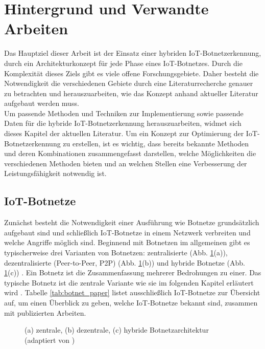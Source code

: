 \section{Hintergrund und Verwandte Arbeiten}

Das Hauptziel dieser Arbeit ist der Einsatz einer hybriden IoT-Botnetzerkennung, durch ein Architekturkonzept für jede Phase eines IoT-Botnetzes. Durch die Komplexität dieses Ziels gibt es viele offene Forschungsgebiete. Daher besteht die Notwendigkeit die verschiedenen Gebiete durch eine Literaturrecherche genauer zu betrachten und herauszuarbeiten, wie das Konzept anhand aktueller Literatur aufgebaut werden muss. \\[0.2in]

Um passende Methoden und Techniken zur Implementierung sowie passende Daten für die hybride IoT-Botnetzerkennung herauszuarbeiten, widmet sich dieses Kapitel der aktuellen Literatur. Um ein Konzept zur Optimierung der IoT-Botnetzerkennung zu erstellen, ist es wichtig, dass bereits bekannte Methoden und deren Kombinationen zusammengefasst darstellen, welche Möglichkeiten die verschiedenen Methoden bieten und an welchen Stellen eine Verbesserung der Leistungsfähigkeit notwendig ist. 

\subsection{IoT-Botnetze}

Zunächst besteht die Notwendigkeit einer Ausführung wie Botnetze grundsätzlich aufgebaut sind und schließlich IoT-Botnetze in einem Netzwerk verbreiten und welche Angriffe möglich sind. Beginnend mit Botnetzen im allgemeinen gibt es typischerweise drei Varianten von Botnetzen: zentralisierte (Abb. \ref{fig:bot_arch}(a)), dezentralisierte (Peer-to-Peer, P2P) (Abb. \ref{fig:bot_arch}(b)) und hybride Botnetze (Abb. \ref{fig:bot_arch}(c)) \cite{sharma_2022,10.1007/978-3-030-33229-7_21,DBLP:series/isc/Oorschot21}. Ein Botnetz ist die Zusammenfassung mehrerer Bedrohungen zu einer. Das typische Botnetz ist die zentrale Variante wie sie im folgenden Kapitel erläutert wird \cite{SCHILLER200729}. Tabelle \ref{tab:botnet_paper} listet ausschließlich IoT-Botnetze zur Übersicht auf, um einen Überblick zu geben, welche IoT-Botnetze bekannt sind, zusammen mit publizierten Arbeiten. 

\begin{figure}[ht]
    \centering
    
    \caption{(a) zentrale, (b) dezentrale, (c) hybride Botnetzarchitektur (adaptiert von \cite{10.1007/978-3-030-33229-7_21})}
    \label{fig:bot_arch}
\end{figure}

